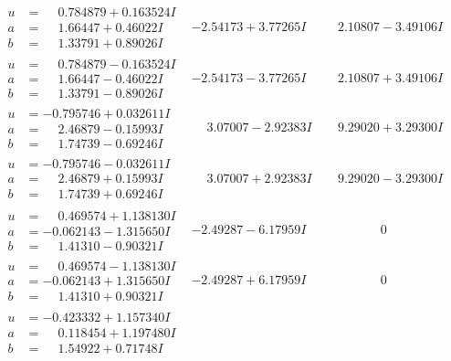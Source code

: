 \documentclass[1p]{elsarticle_modified}
\theoremstyle{definition}
\begin{document}
$$\begin{array}{c|c|c}
\begin{aligned}
u &= \phantom{-}0.784879 + 0.163524 I \\
a &= \phantom{-}1.66447 + 0.46022 I \\
b &= \phantom{-}1.33791 + 0.89026 I\end{aligned}
 & -2.54173 + 3.77265 I & \phantom{-}2.10807 - 3.49106 I \\ \hline\begin{aligned}
u &= \phantom{-}0.784879 - 0.163524 I \\
a &= \phantom{-}1.66447 - 0.46022 I \\
b &= \phantom{-}1.33791 - 0.89026 I\end{aligned}
 & -2.54173 - 3.77265 I & \phantom{-}2.10807 + 3.49106 I \\ \hline\begin{aligned}
u &= -0.795746 + 0.032611 I \\
a &= \phantom{-}2.46879 - 0.15993 I \\
b &= \phantom{-}1.74739 - 0.69246 I\end{aligned}
 & \phantom{-}3.07007 - 2.92383 I & \phantom{-}9.29020 + 3.29300 I \\ \hline\begin{aligned}
u &= -0.795746 - 0.032611 I \\
a &= \phantom{-}2.46879 + 0.15993 I \\
b &= \phantom{-}1.74739 + 0.69246 I\end{aligned}
 & \phantom{-}3.07007 + 2.92383 I & \phantom{-}9.29020 - 3.29300 I \\ \hline\begin{aligned}
u &= \phantom{-}0.469574 + 1.138130 I \\
a &= -0.062143 - 1.315650 I \\
b &= \phantom{-}1.41310 - 0.90321 I\end{aligned}
 & -2.49287 - 6.17959 I & \phantom{-0.000000 } 0 \\ \hline\begin{aligned}
u &= \phantom{-}0.469574 - 1.138130 I \\
a &= -0.062143 + 1.315650 I \\
b &= \phantom{-}1.41310 + 0.90321 I\end{aligned}
 & -2.49287 + 6.17959 I & \phantom{-0.000000 } 0 \\ \hline\begin{aligned}
u &= -0.423332 + 1.157340 I \\
a &= \phantom{-}0.118454 + 1.197480 I \\
b &= \phantom{-}1.54922 + 0.71748 I\end{aligned}

\end{array}$$
\end{document}
